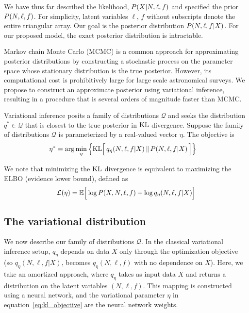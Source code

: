 We have thus far described the likelihood,
$P(X | N, \ell, f)$ and specified the prior $P(N, \ell, f)$. 
For simplicity, latent variables $\ell$, $f$ without subscripts  
denote the entire triangular array. Our goal is
the posterior distribution $P(N, \ell, f | X)$. For our proposed model,
the exact posterior distribution is intractable.

Markov chain Monte Carlo (MCMC) is a common approach for approximating
posterior distributions by constructing a stochastic process on the parameter space
whose stationary distribution is the true posterior. However,
its computational cost is prohibitively large for
large scale astronomical surveys. We propose to construct an approximate posterior
using variational inference, resulting in a procedure that is several orders of
magnitude faster than MCMC.

Variational inference\cite{Blei_2017_vi_review, Jordan_intro_vi, Wainwrite_graph_models_vi}
posits a family of distributions $\mathcal{Q}$ and seeks
the distribution $q^*\in \mathcal{Q}$ that is closest to the true posterior
in $\textrm{KL}$ divergence. Suppose the family of distributions $\mathcal{Q}$ is parameterized by a real-valued vector $\eta$. The objective is 
\begin{align}
   \eta^* &= \arg \min_{\eta} \Big\{ \mathrm{KL}\Big[\,q_\eta(N, \ell, f | X)\, \| \,P(N, \ell, f | X )\,\Big]\Big\} 
   \label{eq:kl_objective}
\end{align}

We note that minimizing the $\textrm{KL}$ divergence is equivalent to maximizing the ELBO (evidence lower bound), defined as 
\begin{align}
    \mathcal{L}(\eta) = \mathbb{E}\Big[\log P(X, N, \ell, f) + \log q_\eta(N, \ell, f | X)\Big]
\end{align}

\subsection{The variational distribution}
We now describe our family of distributions $\mathcal{Q}$. In the classical variational inference setup, $q_\eta$ depends on data $X$ only through the optimization objective (so $q_\eta(N, \ell, f | X)$,
becomes $q_\eta(N, \ell, f)$ with no dependence on $X$). Here, we take an amortized approach, where 
$q_\eta$ takes as input data $X$ and returns a distribution on the 
latent variables $(N, \ell, f)$. This mapping is constructed using a 
neural network, and the variational parameter $\eta$ in equation~\ref{eq:kl_objective} are the neural network weights. 

